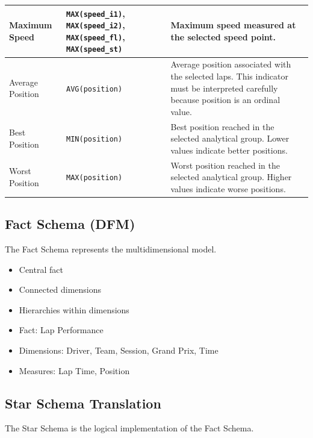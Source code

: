 \documentclass[a4paper,11pt]{article}
\begin{document}
\begin{longtable}{|p{4.5cm}|p{5.2cm}|p{6cm}|}
		Maximum Speed
		& \texttt{MAX(speed\_i1)}, \texttt{MAX(speed\_i2)}, \texttt{MAX(speed\_fl)}, \texttt{MAX(speed\_st)}
		& Maximum speed measured at the selected speed point. \\
		\hline
		
		Average Position
		& \texttt{AVG(position)}
		& Average position associated with the selected laps. This indicator must be interpreted
		carefully because position is an ordinal value. \\
		\hline
		
		Best Position
		& \texttt{MIN(position)}
		& Best position reached in the selected analytical group. Lower values indicate better positions. \\
		\hline
		
		Worst Position
		& \texttt{MAX(position)}
		& Worst position reached in the selected analytical group. Higher values indicate worse positions. \\
		\hline
		
	\end{longtable}
	

	
	\subsection{Fact Schema (DFM)}
	
	
	The Fact Schema represents the multidimensional model.
	
	
	\begin{itemize}
		\item Central fact
		\item Connected dimensions
		\item Hierarchies within dimensions
	\end{itemize}
	
	
	\begin{itemize}
		\item Fact: Lap Performance
		\item Dimensions: Driver, Team, Session, Grand Prix, Time
		\item Measures: Lap Time, Position
	\end{itemize}
	
	\subsection{Star Schema Translation}
	
	
	The Star Schema is the logical implementation of the Fact Schema.
	
\end{document}

